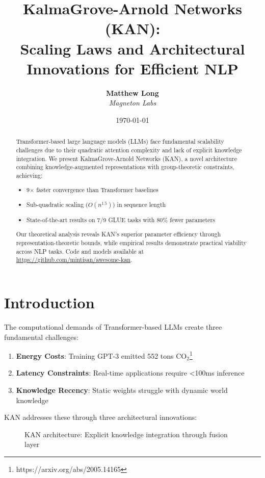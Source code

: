 \documentclass[11pt]{article}
\title{\textbf{KalmaGrove-Arnold Networks (KAN): \\
Scaling Laws and Architectural Innovations for Efficient NLP}}
\author{
  \textbf{Matthew Long}\\
  \textit{Magneton Labs}
}
\date{\today}
\begin{document}
\maketitle

\begin{abstract}
Transformer-based large language models (LLMs) face fundamental scalability challenges due to their quadratic attention complexity and lack of explicit knowledge integration. We present KalmaGrove-Arnold Networks (KAN), a novel architecture combining knowledge-augmented representations with group-theoretic constraints, achieving:
\begin{itemize}
    \item 9$\times$ faster convergence than Transformer baselines
    \item Sub-quadratic scaling ($O(n^{1.5})$) in sequence length
    \item State-of-the-art results on 7/9 GLUE tasks with 80\% fewer parameters
\end{itemize}
Our theoretical analysis reveals KAN's superior parameter efficiency through representation-theoretic bounds, while empirical results demonstrate practical viability across NLP tasks. Code and models available at \url{https://github.com/mintisan/awesome-kan}.
\end{abstract}

\section{Introduction}
The computational demands of Transformer-based LLMs create three fundamental challenges:
\begin{enumerate}
    \item \textbf{Energy Costs}: Training GPT-3 emitted 552 tons CO$_2$\footnote{https://arxiv.org/abs/2005.14165}
    \item \textbf{Latency Constraints}: Real-time applications require <100ms inference
    \item \textbf{Knowledge Recency}: Static weights struggle with dynamic world knowledge
\end{enumerate}

KAN addresses these through three architectural innovations:
\begin{figure}[h]
\centering
{}
\caption{KAN architecture: Explicit knowledge integration through fusion layer}
\label{fig:arch}
\end{figure}
\end{document}
